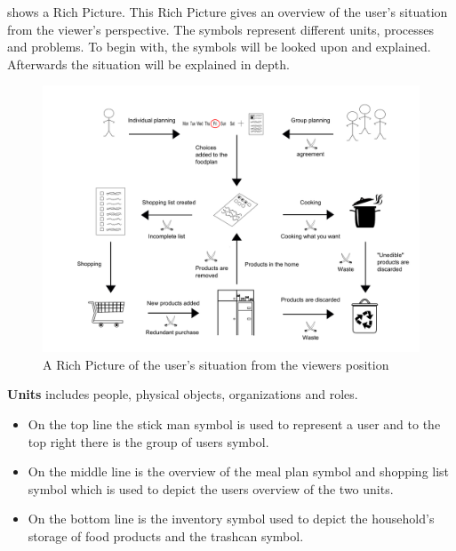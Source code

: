  shows a Rich Picture. This Rich Picture gives an overview of the user's situation from the viewer's perspective.
The symbols represent different units, processes and problems.
To begin with, the symbols will be looked upon and explained. Afterwards the situation will be explained in depth.

\begin{figure}[H]
	\centering
	\includegraphics[width=1.00\textwidth]{Grafik/FoodPlanner/InkscapeTegninger/RigtBilledeUpdated.pdf}
	\caption{A Rich Picture of the user's situation from the viewers position}
	\label{RigtBillede}
\end{figure}

\textbf{Units} includes people, physical objects, organizations and roles.
\begin{itemize}
  \item On the top line the stick man symbol is used to represent a user and to the top right there is the group of users symbol. 
  \item On the middle line is the overview of the meal plan symbol and shopping list symbol which is used to depict the users overview of the two units. 
  \item On the bottom line is the inventory symbol used to depict the household's storage of food products and the trashcan symbol.    
\end{itemize}

